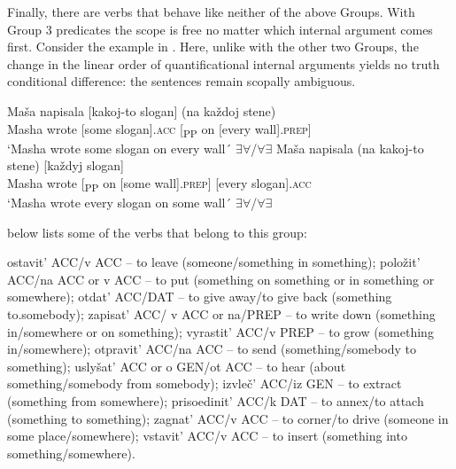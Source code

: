 \documentclass[output=paper,colorlinks,citecolor=brown]{./langscibook}
\begin{document}
Finally, there are verbs that behave like neither of the above Groups. With Group 3 predicates the scope is free no matter which internal argument comes first. Consider the example in . Here, unlike with the other two Groups, the change in the linear order of quantificational internal arguments yields no truth conditional difference: the sentences remain scopally ambiguous.


\ea%
    \label{ex:antonyuk:17}
    \ea \label{ex:antonyuk:17a}
    \gll Maša   napisala [kakoj-to slogan] {} (na  každoj stene)\\
    Masha wrote     [some      slogan].\textsc{acc} [\textsubscript{PP} on [every  wall].\textsc{prep}]\\
    \glt `Masha wrote some slogan on every wall´ \hfill ${\exists}{\forall}$/${\forall}{\exists}$
    \ex \label{ex:antonyuk:17b}
    \gll Maša   napisala {} (na kakoj-to stene)         [každyj slogan] \\
    Masha wrote [\textsubscript{PP} on [some     wall].\textsc{prep}] [every   slogan].\textsc{acc}\\
    \glt `Masha wrote every slogan on some wall´ \hfill ${\exists}{\forall}$/${\forall}{\exists}$
    \z
\z

 below lists some of the verbs that belong to this group:

\ea%
    \label{ex:antonyuk:18}
    \ea \label{ex:antonyuk:18a}
    ostavit’ ACC/v ACC – to leave (someone/something in something);
    \ex \label{ex:antonyuk:18b}
    položit’ ACC/na ACC or v ACC – to put (something on something or in something or somewhere);
    \ex \label{ex:antonyuk:18c}
    otdat’ ACC/DAT – to give away/to give back (something to.somebody);
    \ex \label{ex:antonyuk:18d}
    zapisat’ ACC/ v ACC or na/PREP – to write down (something in/somewhere or on something);
    \ex \label{ex:antonyuk:18e}
    vyrastit’ ACC/v PREP – to grow (something in/somewhere);
    \ex \label{ex:antonyuk:18f}
    otpravit’ ACC/na ACC – to send (something/somebody to something);
    \ex \label{ex:antonyuk:18g}
    uslyšat’ ACC or o GEN/ot ACC – to hear (about something/somebody from somebody);
    \ex \label{ex:antonyuk:18h}
    izvleč’ ACC/iz GEN – to extract (something from somewhere);
    \ex \label{ex:antonyuk:18i}
    prisoedinit’ ACC/k DAT – to annex/to attach (something to something);
    \ex \label{ex:antonyuk:18j}
    zagnat’ ACC/v ACC – to corner/to drive (someone in some place/somewhere);
    \ex \label{ex:antonyuk:18k}
    vstavit’ ACC/v ACC – to insert (something into something/somewhere).
    \z
\z
\end{document}
